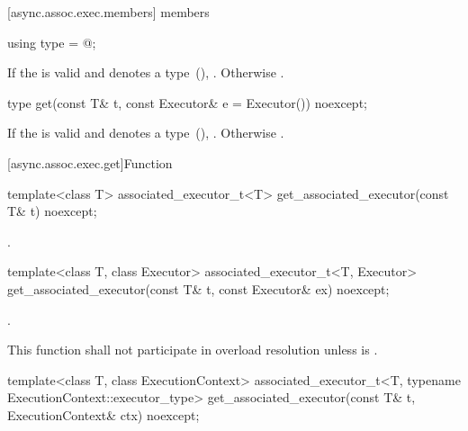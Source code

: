[async.assoc.exec.members]{ members}

\begin{itemdecl}
using type = @\seebelow@;
\end{itemdecl}

\begin{itemdescr}
\pnum
\ctype If the  
is valid and denotes a type~(), .
Otherwise .
\end{itemdescr}

\begin{itemdecl}
type get(const T& t, const Executor& e = Executor()) noexcept;
\end{itemdecl}

\begin{itemdescr}
\pnum
\returns If the  
is valid and denotes a type~(), .
Otherwise .
\end{itemdescr}




[async.assoc.exec.get]{Function }

%
\begin{itemdecl}
template<class T>
  associated_executor_t<T> get_associated_executor(const T& t) noexcept;
\end{itemdecl}

\begin{itemdescr}
\pnum
\returns {}.
\end{itemdescr}

\begin{itemdecl}
template<class T, class Executor>
  associated_executor_t<T, Executor>
    get_associated_executor(const T& t, const Executor& ex) noexcept;
\end{itemdecl}

\begin{itemdescr}
\pnum
\returns {}.

\pnum
\remarks This function shall not participate in overload resolution unless
 is .
\end{itemdescr}

\begin{itemdecl}
template<class T, class ExecutionContext>
  associated_executor_t<T, typename ExecutionContext::executor_type>
    get_associated_executor(const T& t, ExecutionContext& ctx) noexcept;
\end{itemdecl}

